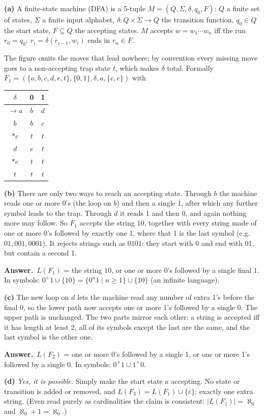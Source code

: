 \documentclass[11pt,a4paper]{article}
\newcommand{\eps}{\varepsilon}
\newcommand{\ans}[1]{\par\smallskip\noindent\colorbox{mist}{\parbox{\dimexpr\linewidth-2\fboxsep}{\sffamily\small\textbf{\color{teal}Answer.}\ \color{ink}#1}}\par}
\begin{document}
\begin{solution}
\textbf{(a)} A finite-state machine (DFA) is a 5-tuple $M=(Q,\Sigma,\delta,q_0,F)$: $Q$ a finite set of states, $\Sigma$ a finite input alphabet, $\delta:Q\times\Sigma\to Q$ the transition function, $q_0\in Q$ the start state, $F\subseteq Q$ the accepting states. $M$ accepts $w=w_1\cdots w_n$ iff the run $r_0=q_0,\ r_{i}=\delta(r_{i-1},w_i)$ ends in $r_n\in F$.

The figure omits the moves that lead nowhere; by convention every missing move goes to a non-accepting trap state $t$, which makes $\delta$ total. Formally
$F_1=(\{a,b,c,d,e,t\},\{0,1\},\delta,a,\{c,e\})$ with
\begin{center}\small\begin{tabular}{c|cc}\toprule $\delta$&0&1\\\midrule $\to a$&$b$&$d$\\ $b$&$b$&$c$\\ $*c$&$t$&$t$\\ $d$&$e$&$t$\\ $*e$&$t$&$t$\\ $t$&$t$&$t$\\\bottomrule\end{tabular}\end{center}

\textbf{(b)} There are only two ways to reach an accepting state. Through $b$ the machine reads one or more 0's (the loop on $b$) and then a single 1, after which any further symbol leads to the trap. Through $d$ it reads 1 and then 0, and again nothing more may follow. So $F_1$ accepts the string $10$, together with every string made of one or more 0's followed by exactly one 1, where that 1 is the last symbol (e.g.\ $01, 001, 0001$). It rejects strings such as $0101$: they start with 0 and end with 01, but contain a second 1.
\ans{$L(F_1)$ = the string $10$, or one or more 0's followed by a single final 1. In symbols: $0^+1\cup\{10\}=\{0^n1\mid n\ge1\}\cup\{10\}$ (an infinite language).}

\textbf{(c)} The new loop on $d$ lets the machine read any number of extra 1's before the final 0, so the lower path now accepts one or more 1's followed by a single 0. The upper path is unchanged. The two parts mirror each other: a string is accepted iff it has length at least 2, all of its symbols except the last are the same, and the last symbol is the other one.
\ans{$L(F_2)$ = one or more 0's followed by a single 1, or one or more 1's followed by a single 0. In symbols: $0^+1\cup1^+0$.}

\textbf{(d)} \emph{Yes, it is possible.} Simply make the start state $a$ accepting. No state or transition is added or removed, and $L(F_3)=L(F_1)\cup\{\eps\}$: exactly one extra string. (Even read purely as cardinalities the claim is consistent: $|L(F_1)|=\aleph_0$ and $\aleph_0+1=\aleph_0$.)
\end{solution}
\end{document}
